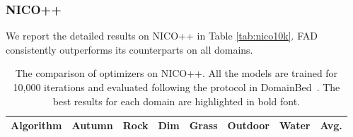\begin{table}[th]
\begin{tabular}{lcccccc|c}
\bottomrule
\end{tabular}
\label{tab:domainnet15k}
\end{table}


\subsubsection{NICO++}
We report the detailed results on NICO++ in Table \ref{tab:nico10k}. FAD consistently outperforms its counterparts on all domains.
\begin{table}[th]

\centering
\caption{The comparison of optimizers on NICO++. All the models are trained for 10,000 iterations and evaluated following the protocol in DomainBed~\cite{gulrajani2020search}. The best results for each domain are highlighted in bold font.}
\begin{tabular}{lcccccc|c}
\toprule
\textbf{Algorithm} & Autumn & Rock & Dim & Grass  & Outdoor & Water &\textbf{Avg.} \\
\midrule


\end{tabular}
\end{table}
